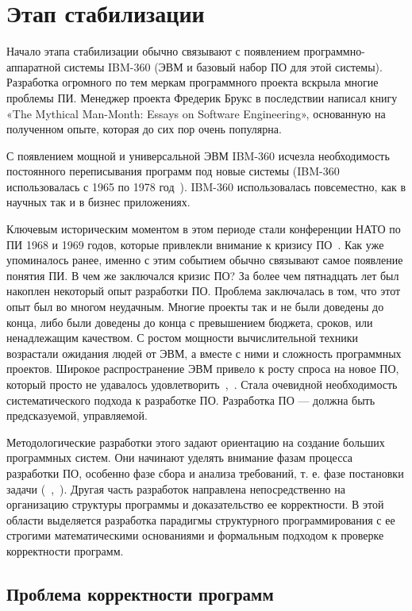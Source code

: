 \section{Этап стабилизации}

Начало этапа стабилизации обычно связывают с появлением программно-аппаратной системы IBM-360 (ЭВМ и базовый набор ПО для этой системы). Разработка огромного по тем меркам программного проекта вскрыла многие проблемы ПИ. Менеджер проекта Фредерик Брукс в последствии написал книгу «The Mythical Man-Month: Essays on Software 
Engineering», основанную на полученном опыте, которая до сих пор очень популярна.

С появлением мощной и универсальной ЭВМ IBM-360 исчезла необходимость постоянного переписывания программ под новые системы (IBM-360 использовалась с 1965 по 1978 год~\cite{IBM360}). IBM-360 использовалась повсеместно, как в научных так и в бизнес приложениях.

Ключевым историческим моментом в этом периоде стали конференции НАТО по ПИ 1968 и 1969 годов, которые привлекли внимание к кризису ПО~\cite{CRISIS}. Как уже упоминалось ранее, именно с этим событием обычно связывают самое появление понятия ПИ. В чем же заключался кризис ПО?  За более чем пятнадцать лет был накоплен некоторый опыт разработки ПО. Проблема заключалась в том, что этот опыт был во многом неудачным. Многие проекты так и не были доведены до конца, либо были доведены до конца с превышением бюджета, сроков, или ненадлежащим качеством. С ростом мощности вычислительной техники возрастали ожидания людей от ЭВМ, а вместе с ними и сложность программных проектов. Широкое распространение ЭВМ привело к росту спроса на новое ПО, который просто не удавалось удовлетворить~\cite{Dijkstra:1972:HP},~\cite{CRISIS}. Стала очевидной необходимость систематического подхода к разработке ПО. Разработка ПО — должна быть предсказуемой, управляемой.

Методологические разработки этого задают ориентацию на создание больших программных систем. Они начинают уделять внимание фазам процесса разработки ПО, особенно фазе сбора и анализа требований, т. е. фазе постановки задачи (~\cite{Alford:1976:REM},~\cite{Ross:1977:SA}). Другая часть разработок направлена непосредственно на организацию структуры программы и доказательство ее корректности. В этой области выделяется разработка парадигмы структурного программирования с ее строгими математическими основаниями и формальным подходом к проверке корректности программ.

\subsection{Проблема корректности программ}

